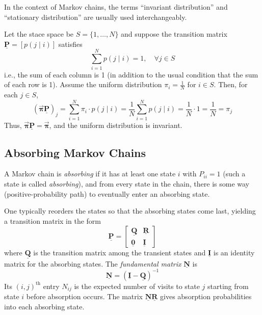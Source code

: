 \documentclass[11pt, headings=standardclasses, parskip=half, twoside]{scrartcl}
\newcommand{\matr}[1]{\underline{\boldsymbol{#1}}}
\newcommand{\vect}[1]{\vec{\boldsymbol{#1}}}
\begin{document}
In the context of Markov chains, the terms “invariant distribution” and “stationary distribution” are usually used interchangeably. 

\begin{example}\label{ex:doubly_stochastic_chain}
  Let the stace space be \(S=\{1,\ldots,N\}\) and suppose the transition matrix \(\matr{P} = [p(j \mid i)]\) satisfies
  \[
  \sum_{i=1}^N p(j \mid i) = 1,\quad \forall j\in S
  \]
  i.e., the sum of each column is 1 (in addition to the usual condition that the sum of each row is 1). 
  Assume the uniform distribution \(\pi_i = \frac{1}{N}\) for \(i\in S\).
  Then, for each \(j\in S\),
  \[
  (\vect{\pi} \matr{P})_j = \sum_{i=1}^N \pi_i \cdot p(j \mid i) = \frac{1}{N} \sum_{i=1}^N p(j \mid i) = \frac{1}{N} \cdot 1 = \frac{1}{N} = \pi_j
  \]
  Thus, \(\vect{\pi} \matr{P} = \vect{\pi}\), and the uniform distribution is invariant.
\end{example}


\subsection{Absorbing Markov Chains}\label{subsec:absorbing}
A Markov chain is \emph{absorbing} if it has at least one state \(i\) with \(P_{ii}=1\) (such a state is called \emph{absorbing}), and from every state in the chain, there is some way (positive-probability path) to eventually enter an absorbing state.

One typically reorders the states so that the absorbing states come last, yielding a transition matrix in the form
\[
\matr{P}=
\begin{bmatrix}
\matr{Q} & \matr{R} \\
\matr{0} & \matr{I}
\end{bmatrix}
\]
where \(\matr{Q}\) is the transition matrix among the transient states and \(\matr{I}\) is an identity matrix for the absorbing states.
The \emph{fundamental matrix} \(\matr{N}\) is
\[
\matr{N}=(\matr{I}-\matr{Q})^{-1}
\]
Its \((i,j)^\text{th}\) entry \(N_{ij}\) is the expected number of visits to state \(j\) starting from state \(i\) before absorption occurs.
The matrix \(\matr{N} \matr{R}\) gives absorption probabilities into each absorbing state.
\end{document}
